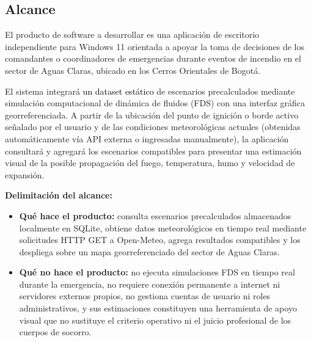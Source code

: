 \subsection{Alcance}

El producto de software a desarrollar es una aplicación de escritorio independiente para Windows 11 orientada a apoyar la toma de decisiones de los comandantes o coordinadores de emergencias durante eventos de incendio en el sector de Aguas Claras, ubicado en los Cerros Orientales de Bogotá.

El sistema integrará \textcolor{black}{un dataset estático} de escenarios precalculados mediante simulación computacional de dinámica de fluidos (FDS) con una interfaz gráfica georreferenciada. A partir de la ubicación del punto de ignición o borde activo señalado por el usuario y de las condiciones meteorológicas actuales (obtenidas automáticamente vía API externa o ingresadas manualmente), la aplicación consultará y agregará los escenarios compatibles para presentar una estimación visual de la posible propagación del fuego, temperatura, humo y velocidad de expansión.

\textbf{Delimitación del alcance:}
\begin{itemize}
    \item \textbf{Qué hace el producto:} consulta escenarios precalculados almacenados localmente en SQLite, obtiene datos meteorológicos en tiempo real mediante solicitudes HTTP GET a Open-Meteo, agrega resultados compatibles y los despliega sobre un mapa georreferenciado del sector de Aguas Claras.
    \item \textbf{Qué no hace el producto:} no ejecuta simulaciones FDS en tiempo real durante la emergencia, no requiere conexión permanente a internet ni servidores externos propios, no gestiona cuentas de usuario ni roles administrativos, y sus estimaciones constituyen una herramienta de apoyo visual que no sustituye el criterio operativo ni el juicio profesional de los cuerpos de socorro.
\end{itemize}
